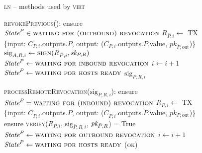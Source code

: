 \begin{figure}[H]
  \begin{processbox}{\textsc{ln} -- methods used by \textsc{virt}}
    \begin{algorithmic}[1]
      \State \textsc{revokePrevious}():
      \Indent
        \State ensure $\textit{State}^P \in \textsc{waiting for (outbound)
        revocation}$
        \State $R_{\bar{P}, i} \gets$ TX \{input: $C_{P, i}$.outputs.$P$,
        output: ($C_{P, i}$.outputs.$P$.value, $pk_{\bar{P}, \mathrm{out}}$)\}
        \State $\mathrm{sig}_{A, R, i} \gets \textsc{sign}(R_{\bar{P}, i},
        \textit{sk}_{P, R})$
          \State $\textit{State}^P \gets \textsc{waiting for inbound revocation}$
        \Else \: 
          \State $i \gets i + 1$
          \State $\textit{State}^P \gets \textsc{waiting for hosts ready}$
        \EndIf
        \State \Return $\mathrm{sig}_{P, R, i}$
      \EndIndent
      \Statex

      \State \textsc{processRemoteRevocation}($\mathrm{sig}_{\bar{P}, R, i}$):
      \Indent
        \State ensure $\textit{State}^P = \textsc{waiting for (inbound)
        revocation}$
        \State $R_{P, i} \gets$ TX \{input: $C_{\bar{P}, i}$.outputs.$P$,
        output: ($C_{\bar{P}, i}$.outputs.$\bar{P}$.value, $pk_{P,
        \mathrm{out}}$)\}
        \State ensure \textsc{verify}($R_{P, i}$, $\mathrm{sig}_{\bar{P}, R,
        i}$, $\textit{pk}_{\bar{P}, R}$) = True
          \State $\textit{State}^P \gets \textsc{waiting for outbound
          revocation}$
        \Else \: 
          \State $i \gets i + 1$
          \State $\textit{State}^P \gets \textsc{waiting for hosts ready}$
        \EndIf
        \State \Return (\textsc{ok})
      \EndIndent
    \end{algorithmic}
  \end{processbox}
  \caption{}
  \label{code:ln:methods-for-virt}
\end{figure}

